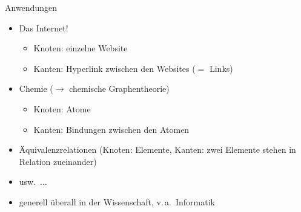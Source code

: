 \documentclass{beamer}
\begin{document}
\begin{frame}{Anwendungen}
	\begin{itemize}
		\item Das Internet!
		\begin{itemize}
			\item Knoten: einzelne Website
			\item Kanten: Hyperlink zwischen den Websites ($=$ Links)
		\end{itemize}
		\item Chemie ($\rightarrow$ chemische Graphentheorie)
		\begin{itemize}
			\item Knoten: Atome
			\item Kanten: Bindungen zwischen den Atomen 
		\end{itemize}
		\item Äquivalenzrelationen (Knoten: Elemente, Kanten: zwei Elemente stehen in Relation zueinander)
		\item usw.\ \(\ldots\)
		\item generell überall in der Wissenschaft, v.\,a.\ Informatik
	\end{itemize}
\end{frame}
\end{document}
